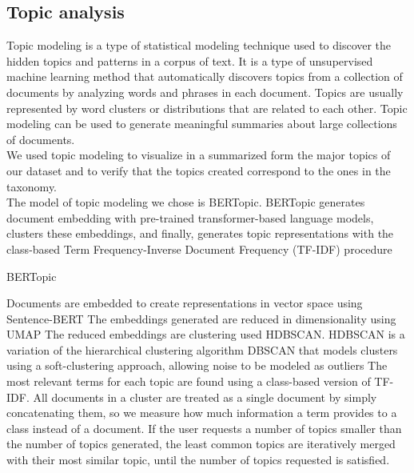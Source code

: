 
\subsection*{Topic analysis}
Topic modeling is a type of statistical modeling technique used to discover the hidden topics and patterns in a corpus of text. It is a type of unsupervised machine learning method that automatically discovers topics from a collection of documents by analyzing words and phrases in each document. Topics are usually represented by word clusters or distributions that are related to each other. Topic modeling can be used to generate meaningful summaries about large collections of documents. \\
We used topic modeling to visualize in a summarized form the major topics of our dataset and to verify that the topics created correspond to the ones in the taxonomy. \\
The model of topic modeling we chose is BERTopic\cite{grootendorst2022bertopic}. BERTopic generates document embedding with pre-trained transformer-based language models, clusters these embeddings, and finally, generates topic representations with the class-based Term Frequency-Inverse Document Frequency (TF-IDF) procedure
\begin{algorithm}
    \caption*{BERTopic}
    \begin{algorithmic}[1]
      \State Documents are embedded to create representations in vector space using Sentence-BERT
      \State The embeddings generated are reduced in dimensionality using UMAP
      \State The reduced embeddings are clustering used HDBSCAN. HDBSCAN is a variation of the hierarchical clustering algorithm DBSCAN that models clusters using a soft-clustering approach, allowing noise to be modeled as outliers
      \State The most relevant terms for each topic are found using a class-based version of TF-IDF. All documents in a cluster are treated as a single document by simply concatenating them, so we measure how much information a term provides to a class instead of a document.
      \State If the user requests a number of topics smaller than the number of topics generated, the least common topics are iteratively merged with their most similar topic, until the number of topics requested is satisfied.
    \end{algorithmic}
\end{algorithm}

